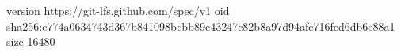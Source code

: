 version https://git-lfs.github.com/spec/v1
oid sha256:e774a0634743d367b841098bcbb89e43247c82b8a97d94afe716fcd6db6e88a1
size 16480
